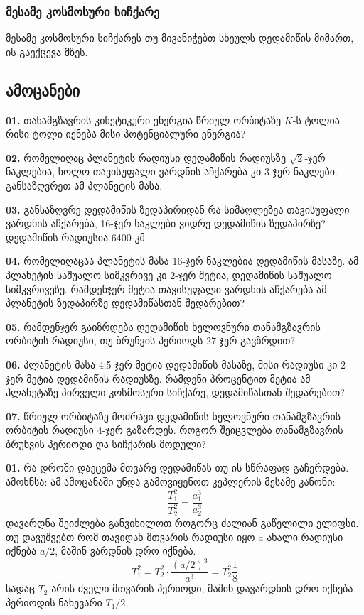 \documentclass{book}
\begin{document}
\subsubsection{მესამე კოსმოსური სიჩქარე}
მესამე კოსმოსური სიჩქარეს თუ მივანიჭებთ სხეულს დედამიწის მიმართ, ის გაექცევა მზეს.


\subsection{ამოცანები}
\qquad \textbf{01.} თანამგზავრის კინეტიკური ენერგია წრიულ ორბიტაზე $K$-ს ტოლია. რისი ტოლი იქნება მისი პოტენციალური ენერგია?

\textbf{02.} რომელიღაც პლანეტის რადიუსი დედამიწის რადიუსზე $\sqrt{2}$-ჯერ ნაკლებია, ხოლო თავისუფალი ვარდნის აჩქარება კი 3-ჯერ ნაკლები. განსაზღვრეთ ამ პლანეტის მასა.

\textbf{03.} განსაზღვრე დედამიწის ზედაპირიდან რა სიმაღლეზეა თავისუფალი ვარდნის აჩქარება, 16-ჯერ ნაკლები ვიდრე დედამიწის ზედაპირზე? დედამიწის რადიუსია 6400 კმ.

\textbf{04.} რომელიღაცაა პლანეტის მასა 16-ჯერ ნაკლებია დედამიწის მასაზე. ამ პლანეტის საშუალო სიმკვრივე კი 2-ჯერ მეტია, დედამიწის საშუალო სიმკვრივეზე. რამდენჯერ მეტია თავისუფალი ვარდნის აჩქარება ამ პლანეტის ზედაპირზე დედამიწასთან შედარებით?

\textbf{05.} რამდენჯერ გაიზრდება დედამიწის ხელოვნური თანამგზავრის ორბიტის რადიუსი, თუ ბრუნვის პერიოდს 27-ჯერ გავზრდით?

\textbf{06.} პლანეტის მასა 4.5-ჯერ მეტია დედამიწის მასაზე, მისი რადიუსი კი 2-ჯერ მეტია დედამიწის რადიუსზე. რამდენი პროცენტით მეტია ამ პლანეტაზე პირველი კოსმოსური სიჩქარე, დედამიწასთან შედარებით?

\textbf{07.} წრიულ ორბიტაზე მოძრავი დედამიწის ხელოვნური თანამგზავრის ორბიტის რადიუსი 4-ჯერ გაზარდეს. როგორ შეიცვლება თანამგზავრის ბრუნვის პერიოდი და სიჩქარის მოდული? 


\textbf{01.} რა დროში დაეცემა მთვარე დედამიწას თუ ის სწრაფად გაჩერდება.\\
ამოხნსა: ამ ამოცანაში უნდა გამოვიყენოთ კეპლერის მესამე კანონი:
	\begin{equation}
		\frac{T_1^2}{T_2^2} = \frac{a_1^3}{a_2^3}
	\end{equation}
დავარდნა შეიძლება განვიხილოთ როგორც ძალიან გაწელილი ელიფსი. თუ დავუშვებთ რომ თავიდან მთვარის რადიუსი იყო $a$ ახალი რადიუსი იქნება $a/2$, მაშინ ვარდნის დრო იქნება.
	\begin{equation}
		T_1^2 = T_2^2\cdot\frac{(a/2)^3}{a^3} = T_2^2 \frac{1}{8}
	\end{equation}
სადაც $T_2$ არის ძველი მთვარის პერიოდი, მაშინ დავარდნის დრო იქნება პერიოდის ნახევარი $T_1/2$
\end{document}
